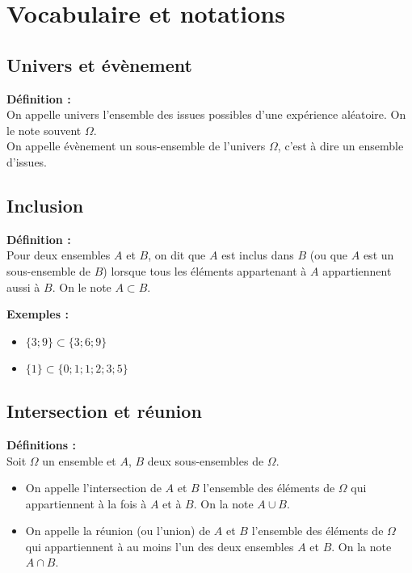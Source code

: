 \documentclass{article}
\title{\doctitre}
\author{\docniveau \\ \doctheme\text{ - }\doctype}
\date{}
\begin{document}
\maketitle
\pagestyle{custom}
\thispagestyle{custom}

\section{Vocabulaire et notations}

\subsection{Univers et évènement}

\begin{mdframed}[style=definitionStyle]
	\textbf{Définition :} ~\\
	On appelle univers l'ensemble des issues possibles d'une expérience aléatoire. On le note souvent $\Omega$.\\
	On appelle évènement un sous-ensemble de l'univers $\Omega$, c'est à dire un ensemble d'issues.
\end{mdframed}

\subsection{Inclusion}

\begin{mdframed}[style=definitionStyle]
	\textbf{Définition :} ~\\
	Pour deux ensembles $A$ et $B$, on dit que $A$ est inclus dans $B$ (ou que $A$ est un sous-ensemble de $B$) lorsque tous les éléments appartenant à $A$
	appartiennent aussi à $B$. On le note $A \subset B$.
\end{mdframed}

\textbf{Exemples :}
\vspace{-4pt}
\begin{itemize}
	\item $\{ 3;9 \} \subset \{ 3;6;9 \} $
	\item $\{ 1 \} \subset \{ 0;1;1;2;3;5 \} $
\end{itemize}

\subsection{Intersection et réunion}

\begin{mdframed}[style=definitionStyle]
	\textbf{Définitions :} ~\\
	Soit $\Omega$ un ensemble et $A$, $B$ deux sous-ensembles de $\Omega$.
	\begin{itemize}
		\item On appelle l'intersection de $A$ et $B$ l'ensemble des éléments de $\Omega$ qui appartiennent à la fois à
		      $A$ et à $B$. On la note $A \cup B$.
		\item On appelle la réunion (ou l'union) de $A$ et $B$ l'ensemble des éléments de $\Omega$ qui appartiennent à au
		      moins l'un des deux ensembles $A$ et $B$. On la note $A \cap B$.
	\end{itemize}
\end{mdframed}
\end{document}
